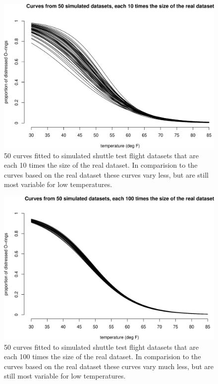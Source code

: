 \documentclass[
  british,
]{book}
\begin{document}
\begin{figure}

{\centering \includegraphics[width=0.8\linewidth]{images/shuttle_simcurves10} 

}

\caption{50 curves fitted to simulated shuttle test flight datasets that are each 10 times the size of the real dataset.  In comparision to the curves based on the real dataset these curves vary less, but are still most variable for low temperatures.}\label{fig:shuttlesimcurves10}
\end{figure}

\begin{figure}

{\centering \includegraphics[width=0.8\linewidth]{images/shuttle_simcurves100} 

}

\caption{50 curves fitted to simulated shuttle test flight datasets that are each 100 times the size of the real dataset. In comparision to the curves based on the real dataset these curves vary much less, but are still most variable for low temperatures.}\label{fig:shuttlesimcurves100}
\end{figure}
\end{document}
